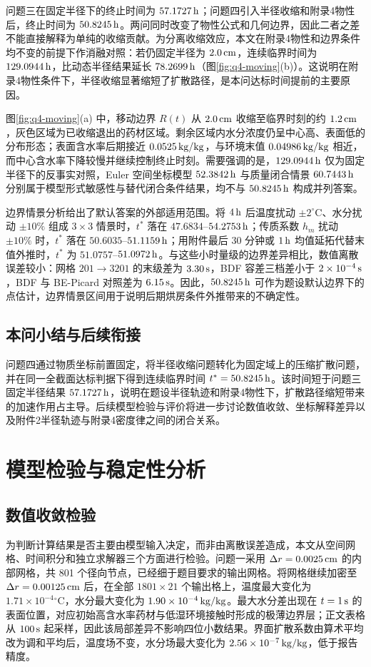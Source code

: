 \documentclass[UTF8,a4paper,12pt]{ctexart}
\numberwithin{equation}{section}
\begin{document}
问题三在固定半径下的终止时间为 $57.1727\rm\,h$；问题四引入半径收缩和附录4物性后，终止时间为 $50.8245\rm\,h$。两问同时改变了物性公式和几何边界，因此二者之差不能直接解释为单纯的收缩贡献。为分离收缩效应，本文在附录4物性和边界条件均不变的前提下作消融对照：若仍固定半径为 $2.0\rm\,cm$，连续临界时间为 $129.0944\rm\,h$，比动态半径结果延长 $78.2699\rm\,h$（图\ref{fig:q4-moving}(b)）。这说明在附录4物性条件下，半径收缩显著缩短了扩散路径，是本问达标时间提前的主要原因。

图\ref{fig:q4-moving}(a) 中，移动边界 $R(t)$ 从 $2.0\rm\,cm$ 收缩至临界时刻的约 $1.2\rm\,cm$，灰色区域为已收缩退出的药材区域。剩余区域内水分浓度仍呈中心高、表面低的分布形态；表面含水率后期接近 $0.0525\rm\,kg/kg$，与环境末值 $0.04986\rm\,kg/kg$ 相近，而中心含水率下降较慢并继续控制终止时刻。需要强调的是，$129.0944\rm\,h$ 仅为固定半径下的反事实对照，Euler 空间坐标模型 $52.3842\rm\,h$ 与质量闭合情景 $60.7443\rm\,h$ 分别属于模型形式敏感性与替代闭合条件结果，均不与 $50.8245\rm\,h$ 构成并列答案。

边界情景分析给出了默认答案的外部适用范围。将 $4\rm\,h$ 后温度扰动 $\pm2^\circ\mathrm C$、水分扰动 $\pm10\%$ 组成 $3\times3$ 情景时，$t^*$ 落在 $47.6834$--$54.2753\rm\,h$；传质系数 $h_m$ 扰动 $\pm10\%$ 时，$t^*$ 落在 $50.6035$--$51.1159\rm\,h$；用附件最后 $30$ 分钟或 $1\rm\,h$ 均值延拓代替末值外推时，$t^*$ 为 $51.0757$--$51.0972\rm\,h$。与这些小时量级的边界差异相比，数值离散误差较小：网格 $201\to3201$ 的末级差为 $3.30\rm\,s$，BDF 容差三档差小于 $2\times10^{-4}\rm\,s$，BDF 与 BE-Picard 对照差为 $6.15\rm\,s$。因此，$50.8245\rm\,h$ 可作为题设默认边界下的点估计，边界情景区间用于说明后期烘房条件外推带来的不确定性。

\subsection{本问小结与后续衔接}
问题四通过物质坐标前置固定，将半径收缩问题转化为固定域上的压缩扩散问题，并在同一全截面达标判据下得到连续临界时间 $t^*=50.8245\rm\,h$。该时间短于问题三固定半径结果 $57.1727\rm\,h$，说明在题设半径轨迹和附录4物性下，扩散路径缩短带来的加速作用占主导。后续模型检验与评价将进一步讨论数值收敛、坐标解释差异以及附件2半径轨迹与附录4密度律之间的闭合关系。

\section{模型检验与稳定性分析}
\subsection{数值收敛检验}
为判断计算结果是否主要由模型输入决定，而非由离散误差造成，本文从空间网格、时间积分和独立求解器三个方面进行检验。问题一采用 $\Delta r=0.0025\rm\,cm$ 的内部网格，共 801 个径向节点，已经细于题目要求的输出网格。将网格继续加密至 $\Delta r=0.00125\rm\,cm$ 后，在全部 $1801\times21$ 个输出格上，温度最大变化为 $1.71\times10^{-4}{}^\circ\mathrm C$，水分最大变化为 $1.90\times10^{-4}\rm\,kg/kg$。最大水分差出现在 $t=1\rm\,s$ 的表面位置，对应初始高含水率药材与低湿环境接触时形成的极薄边界层；正文表格从 $100\rm\,s$ 起采样，因此该局部差异不影响四位小数结果。界面扩散系数由算术平均改为调和平均后，温度场不变，水分场最大变化为 $2.56\times10^{-7}\rm\,kg/kg$，低于报告精度。
\end{document}

